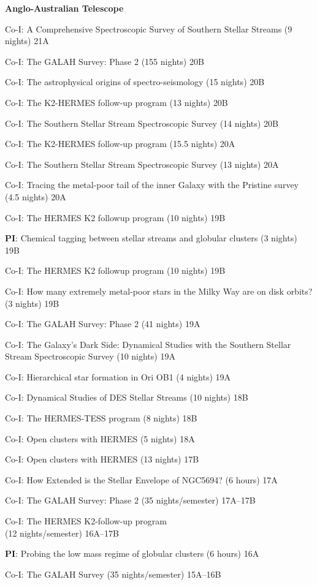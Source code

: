 \documentclass[10pt]{article}
\begin{document}
\textbf{Anglo-Australian Telescope}
\begin{innerlist}
\item Co-I: A Comprehensive Spectroscopic Survey of Southern Stellar Streams (9 nights) \hfill{21A}
\item Co-I: The GALAH Survey: Phase 2 (155 nights) \hfill{20B}
\item Co-I: The astrophysical origins of spectro-seismology (15 nights) \hfill{20B}
\item Co-I: The K2-HERMES follow-up program (13 nights) \hfill{20B}
\item Co-I: The Southern Stellar Stream Spectroscopic Survey (14 nights) \hfill{20B}
\item Co-I: The K2-HERMES follow-up program (15.5 nights) \hfill{20A}
\item Co-I: The Southern Stellar Stream Spectroscopic Survey (13 nights) \hfill{20A}
\item Co-I: Tracing the metal-poor tail of the inner Galaxy with the Pristine survey (4.5 nights) \hfill{20A}
\item Co-I: The HERMES K2 followup program (10 nights) \hfill{19B}
\item \textbf{PI}: Chemical tagging between stellar streams and globular clusters (3 nights) \hfill{19B}
\item Co-I: The HERMES K2 followup program (10 nights) \hfill{19B}
\item Co-I: How many extremely metal-poor stars in the Milky Way are on disk orbits? (3 nights) \hfill{19B}
\item Co-I: The GALAH Survey: Phase 2 (41 nights) \hfill{19A}
\item Co-I: The Galaxy's Dark Side: Dynamical Studies with the Southern Stellar Stream Spectroscopic Survey (10 nights) \hfill{19A}
\item Co-I: Hierarchical star formation in Ori OB1 (4 nights) \hfill{19A}
\item Co-I: Dynamical Studies of DES Stellar Streams (10 nights) \hfill{18B}
\item Co-I: The HERMES-TESS program (8 nights) \hfill{18B}
\item Co-I: Open clusters with HERMES (5 nights) \hfill{18A}
\item Co-I: Open clusters with HERMES (13 nights) \hfill{17B}
\item Co-I: How Extended is the Stellar Envelope of NGC5694? (6 hours) \hfill{17A}
\item Co-I: The GALAH Survey: Phase 2 (35 nights/semester) \hfill{17A--17B}
\item Co-I: The HERMES K2-follow-up program \\ (12 nights/semester)  \hfill{16A--17B}
\item \textbf{PI}: Probing the low mass regime of globular clusters (6 hours) \hfill{16A}
\item Co-I: The GALAH Survey (35 nights/semester) \hfill{15A--16B}
\end{innerlist}
\end{document}
